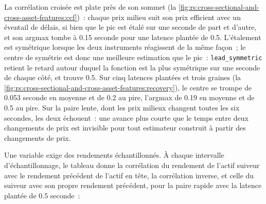La corrélation croisée est plate près de son sommet (la \cref{fig:rs:cross-sectional-and-cross-asset-features:ccf})~: chaque prix milieu suit son
prix efficient avec un éventail de délais, si bien que le pic est étalé sur une seconde de part et d'autre, et son argmax tombe à 0.15 seconde
pour une latence plantée de 0.5. L'étalement est symétrique lorsque les deux instruments réagissent de la même façon~; le centre de symétrie est donc une meilleure estimation que
le pic~: \texttt{lead\_symmetric} retient le retard autour duquel la fonction est la plus symétrique sur une seconde de chaque côté, et
trouve 0.5. Sur cinq latences plantées et trois graines (la \cref{fig:rs:cross-sectional-and-cross-asset-features:recovery}), le
centre se trompe de 0.053 seconde en moyenne et de 0.2 au pire, l'argmax de 0.19 en moyenne et de 0.5 au pire. Sur la paire lente,
dont les prix milieux changent toutes les six secondes, les deux échouent~: une avance plus courte que le temps entre deux changements de prix est invisible pour tout estimateur
construit à partir des changements de prix.

\begin{omfigure}

\label{fig:rs:cross-sectional-and-cross-asset-features:recovery}
\end{omfigure}

Une variable exige des rendements échantillonnés. À chaque intervalle d'échantillonnage, le tableau donne la corrélation du rendement de l'actif suiveur avec le
rendement précédent de l'actif en tête, la corrélation inverse, et celle du suiveur avec son propre rendement précédent, pour la paire rapide avec la
latence plantée de 0.5 seconde~:

